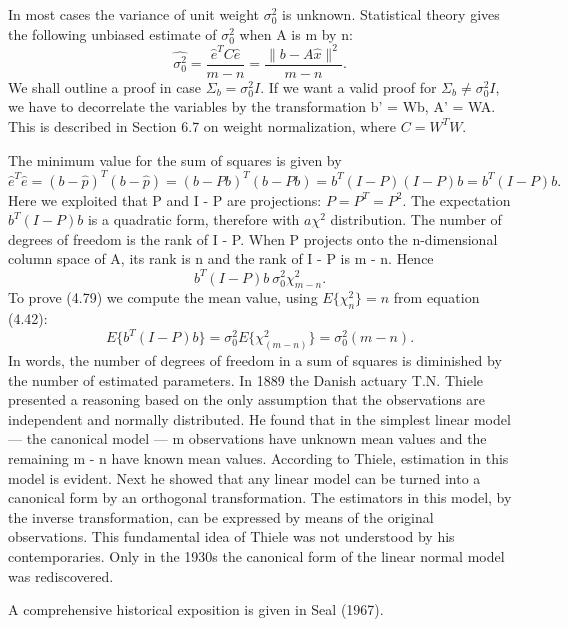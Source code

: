 In most cases the variance of unit weight $\sigma^2_0$ is unknown. Statistical theory gives the
following unbiased estimate of $\sigma^2_0$ when A is m by n:
\begin{equation}
\hat{\sigma^2_0}=\frac{\hat{e}^TC\hat{e}}{m-n}=\frac{\|b-A\hat{x}\|^2}{m-n}.
\end{equation}
We shall outline a proof in case $\Sigma_b=\sigma^2_0I$. If we want a valid proof for $\Sigma_b\neq \sigma^2_0I$, we have to decorrelate the variables by the transformation b' = Wb, A' = WA. This is described in Section 6.7 on weight normalization, where $C=W^TW$.

The minimum value for the sum of squares is given by
\begin{equation}
\hat{e}^T\hat{e}=(b-\hat{p})^T(b-\hat{p})=(b-Pb)^T(b-Pb)=b^T(I-P)(I-P)b=b^T(I-P)b.
\end{equation}
Here we exploited that P and I - P are projections: $P=P^T=P^2$. The expectation
$b^T(I-P)b$ is a quadratic form, therefore with $a\chi^2$ distribution. The number of degrees
of freedom is the rank of I - P. When P projects onto the n-dimensional column space
of A, its rank is n and the rank of I - P is m - n. Hence
\begin{equation*}
b^T(I-P)b~\sigma^2_0\chi^2_{m-n}.
\end{equation*}
To prove (4.79) we compute the mean value, using $E\{\chi^2_n\}=n$ from equation (4.42):
\begin{equation*}
E\{b^T(I-P)b\}=\sigma^2_0E\{\chi^2_(m-n)\}=\sigma^2_0(m-n).
\end{equation*}
In words, the number of degrees of freedom in a sum of squares is diminished by the
number of estimated parameters. In 1889 the Danish actuary T.N. Thiele presented a reasoning based on the only assumption that the observations are independent and normally
distributed. He found that in the simplest linear model — the canonical model — m observations have unknown mean values and the remaining m - n have known mean values. According to Thiele, estimation in this model is evident. Next he showed that any linear model can be turned into a canonical form by an orthogonal transformation. The estimators in this model, by the inverse transformation, can be expressed by means of the original observations. This fundamental idea of Thiele was not understood by his contemporaries. Only in the 1930s the canonical form of the linear normal model was rediscovered.

A comprehensive historical exposition is given in Seal (1967).
 